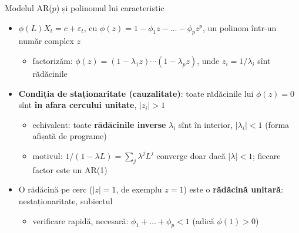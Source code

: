\begin{frame}{Modelul AR($p$) și polinomul lui caracteristic}
\itemsize{\small}
\begin{itemize}
    \item $\phi(L)X_t = c + \varepsilon_t$, cu $\phi(z) = 1 - \phi_1z - \dots - \phi_pz^p$, un polinom într-un număr complex $z$
    \begin{itemize}
        \item factorizăm: $\phi(z) = (1 - \lambda_1z)\cdots(1 - \lambda_pz)$, unde $z_i = 1/\lambda_i$ sînt rădăcinile
    \end{itemize}
    \item \textbf{Condiția de staționaritate (cauzalitate)}: toate rădăcinile lui $\phi(z) = 0$ sînt \textbf{în afara cercului unitate}, $|z_i| > 1$
    \begin{itemize}
        \item echivalent: toate \textbf{rădăcinile inverse} $\lambda_i$ sînt în interior, $|\lambda_i| < 1$ (forma afișată de programe)
        \item motivul: $1/(1 - \lambda L) = \sum_j\lambda^jL^j$ converge doar dacă $|\lambda| < 1$; fiecare factor este un AR(1)
    \end{itemize}
    \item O rădăcină pe cerc ($|z| = 1$, de exemplu $z = 1$) este o \textbf{rădăcină unitară}: nestaționaritate, subiectul 
    \begin{itemize}
        \item verificare rapidă, necesară: $\phi_1 + \dots + \phi_p < 1$ (adică $\phi(1) > 0$)
    \end{itemize}
\end{itemize}
\end{frame}

